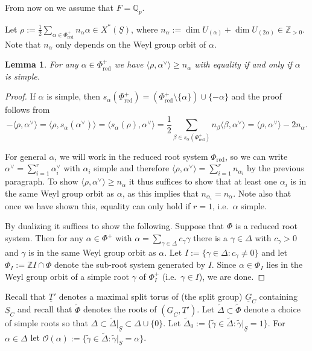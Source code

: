 \documentclass[a4paper]{amsart}
\numberwithin{equation}{section}
\newtheorem{lem}[thm]{Lemma}
\theoremstyle{remark}
\theoremstyle{definition}
\newcommand{\Z}{\mathbb{Z}}
\newcommand{\Q}{\mathbb{Q}}
\newcommand{\alggrp}[1]{\underline{#1}}
\newcommand{\ang}[1]{\langle #1\rangle}
\begin{document}
From now on we assume that $F = \Q_p$.

Let $\rho := \frac 12\sum_{\alpha \in \Phi_{\mathrm{red}}^+} n_\alpha \alpha \in X^*(\alggrp{S})$, where $n_\alpha := \dim U_{(\alpha)} + \dim U_{(2\alpha)} \in \Z_{>0}$.
Note that $n_\alpha$ only depends on the Weyl group orbit of $\alpha$.

\begin{lem}\label{lm:rho}
  For any $\alpha \in \Phi_{\mathrm{red}}^+$ we have $\ang{\rho,\alpha^{\vee}} \ge n_\alpha$ with equality if and only if $\alpha$ is simple.
\end{lem}

\begin{proof}
  If $\alpha$ is simple, then $s_\alpha(\Phi_{\mathrm{red}}^+) = (\Phi_{\mathrm{red}}^+ \setminus \{\alpha\}) \cup \{-\alpha\}$ and the proof follows from
  \begin{equation*}
    -\ang{\rho,\alpha^{\vee}} = \ang{\rho,s_\alpha(\alpha^{\vee})} = \ang{s_\alpha(\rho),\alpha^{\vee}} = \frac 12\sum_{\beta \in s_\alpha(\Phi_{\mathrm{red}}^+)} n_\beta \ang{\beta,\alpha^{\vee}}
    = \ang{\rho,\alpha^{\vee}} - 2n_\alpha.
  \end{equation*}

  For general $\alpha$, we will work in the reduced root system $\Phi_{\mathrm{red}}$, so we can write $\alpha^{\vee} = \sum_{i=1}^r \alpha_i^{\vee}$ with $\alpha_i$ simple
  and therefore $\ang{\rho,\alpha^{\vee}} = \sum_{i=1}^r n_{\alpha_i}$ by the previous paragraph. 
  To show $\ang{\rho,\alpha^{\vee}} \ge n_\alpha$ it thus suffices to show that at least one $\alpha_i$ is in the same Weyl group orbit as $\alpha$, as this implies that $n_{\alpha_{i}} = n_{\alpha}$.
  Note also that once we have shown this, equality can only hold if $r = 1$, i.e.\ $\alpha$ simple.

  By dualizing it suffices to show the following. Suppose that $\Phi$ is a reduced root system.
  Then for any $\alpha \in \Phi^+$ with $\alpha = \sum_{\gamma \in \Delta} c_\gamma \gamma$ there is a $\gamma \in \Delta$ with $c_\gamma > 0$ and $\gamma$ is in the same Weyl group orbit as $\alpha$.
  Let $I := \{ \gamma \in \Delta : c_\gamma \ne 0 \}$ and let $\Phi_I := \Z I \cap \Phi$ denote the sub-root system generated by $I$.
  Since $\alpha\in \Phi_I$ lies in the Weyl group orbit of a simple root $\gamma$ of $\Phi_I^+$ (i.e.\ $\gamma \in I$), we are done.
\end{proof}

Recall that $\alggrp{T}'$ denotes a maximal split torus of (the split group) $\alggrp{G}_C$ containing $\alggrp{S}_C$
and recall that $\widetilde{\Phi}$ denotes the roots of $(\alggrp{G}_C,\alggrp{T}')$.
Let $\widetilde{\Delta} \subset \widetilde{\Phi}$ denote a choice of simple roots so that
$\Delta \subset \widetilde{\Delta}|_{\alggrp{S}} \subset \Delta \cup \{0\}$.
Let $\widetilde{\Delta}_0 := \{ \widetilde{\gamma} \in \widetilde{\Delta} : \widetilde{\gamma}|_{\alggrp{S}} = 1\}$. 
For $\alpha \in \Delta$ let $\mathcal{O}(\alpha) := \{ \widetilde{\gamma} \in \widetilde{\Delta} : \widetilde{\gamma}|_{\alggrp{S}} = \alpha \}$.
\end{document}
